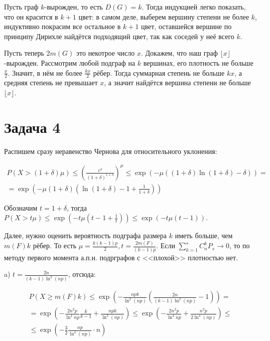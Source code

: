 \documentclass{article}
\theoremstyle{definition}
\theoremstyle{remark}
\renewcommand{\le}{\leqslant}
\renewcommand{\ge}{\geqslant}
\begin{document}
Пусть граф $k$-вырожден, то есть $D(G) = k$. Тогда индукцией легко показать, что он красится в $k+1$
цвет: в самом деле, выберем вершину степени не более $k$, индуктивно покрасим все остальное в $k+1$
цвет, оставшейся вершине по принципу Дирихле найдётся подходящий цвет, так как соседей у неё всего
$k$.

Пусть теперь $2m(G)$ это некотрое число $x$. Докажем, что наш граф $\lfloor x \rfloor$-вырожден.
Рассмотрим любой подграф на $k$ вершинах, его плотность не больше $\frac{x}{2}$. Значит, в нём не
более $\frac{kx}{2}$ рёбер. Тогда суммарная степень не больше $kx$, а средняя степень не превышает
$x$, а значит найдётся вершина степени не больше $\lfloor x \rfloor$.

\section*{Задача 4}

Распишем сразу неравенство Чернова для относительного уклонения:

\begin{multline*}
	P(X > (1 + \delta)\mu) \le \left(\frac{e^\delta}{(1 + \delta)^{1 + \delta}}\right)^\mu \le
	\exp(-\mu((1 + \delta) \ln(1 + \delta) - \delta)) =\\=
	\exp\left(-\mu(1+\delta)\left( \ln(1 + \delta) - 1 + \frac{1}{1 + \delta} \right) \right)
\end{multline*}

Обозначим $t = 1 + \delta$, тогда $P(X > t\mu) \le \exp\left(-t\mu \left(t - 1 + \frac{1}{t}
\right) \right) \le \exp\left(-t\mu \left(t - 1\right) \right)$.

Далее, нужно оценить вероятность подграфа размера $k$ иметь больше, чем $m(F)k$ рёбер. То есть $\mu
= \frac{k(k-1)p}{2}, t = \frac{2m(F)}{(k-1)p}$. Если $\sum\limits_{k=1}^{s} C_n^k P_s \rightarrow
0$, то по методу первого момента а.п.н. подрграфов с <<плохой>> плотностью нет.

a) $t = \frac{2n}{(k-1)\ln^2(np)}$, отсюда:

\begin{multline*}
	P(X \ge m(F)k) \le \exp\left(-\frac{npk}{\ln^2(np)}\left( \frac{2n}{(k-1)\ln^2(np)} - 1\right)
	\right) =\\=
	\exp\left(-\frac{2n^2p}{\ln^4{np}}\frac{k}{k-1} + \frac{npk}{\ln^2(np)} \right) \le
	\exp\left(-\frac{2n^2p}{\ln^4{np}} + \frac{n^2p}{2\ln^4(np)} \right) \le\\\le \exp\left(
	-\frac{3}{2} \frac{np}{\ln^4(np)} \cdot n\right)
\end{multline*}
\end{document}
